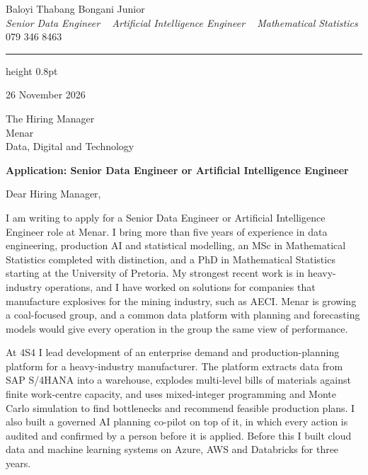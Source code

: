 \documentclass[a4paper,11pt]{article}
\begin{document}
\begin{center}
    {\huge Baloyi Thabang Bongani Junior} \\ \vspace{2pt}
    {\large\textit{Senior Data Engineer \textbar~ Artificial Intelligence Engineer \textbar~ Mathematical Statistics}} \\ \vspace{4pt}
    {079 346 8463} ~\textbar~
    \href{mailto:Baloyibongani1@gmail.com}{\color{blue}{Baloyibongani1@gmail.com}} ~\textbar~
    \href{https://www.linkedin.com/in/thabang-bongani-junior-baloyi-2622b0286/}{\color{blue}{LinkedIn}} ~\textbar~
    \href{https://github.com/thabangTheActuaryCoder}{\color{blue}{GitHub}}
\end{center}
{\color{airforceblue}\hrule height 0.8pt}

\vspace{6pt}
26 November 2026

The Hiring Manager \\
Menar \\
Data, Digital and Technology

\textbf{Application: Senior Data Engineer or Artificial Intelligence Engineer}

Dear Hiring Manager,

I am writing to apply for a Senior Data Engineer or Artificial Intelligence Engineer role at
Menar. I bring more than five years of experience in data engineering, production AI and
statistical modelling, an MSc in Mathematical Statistics completed with distinction, and a PhD in
Mathematical Statistics starting at the University of Pretoria. My strongest recent work is in
heavy-industry operations, and I have worked on solutions for companies that manufacture explosives
for the mining industry, such as AECI. Menar is growing a coal-focused group, and a common data platform with planning and forecasting models would give every operation in the group the same view of performance.

At 4S4 I lead development of an enterprise demand and production-planning platform for a
heavy-industry manufacturer. The platform extracts data from SAP S/4HANA into a warehouse, explodes multi-level
bills of materials against finite work-centre capacity, and uses mixed-integer programming
and Monte Carlo simulation to find bottlenecks and recommend feasible production plans. I also built a governed AI planning co-pilot on top
of it, in which every action is audited and confirmed by a person before it is applied. Before this I
built cloud data and machine learning systems on Azure, AWS and Databricks for three years.
\end{document}
